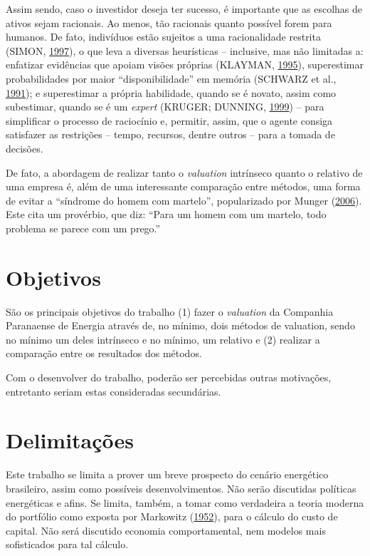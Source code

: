\documentclass[grad,numbers]{coppe}
\begin{document}
  Assim sendo, caso o investidor deseja ter sucesso, é importante que as escolhas de ativos sejam racionais. Ao menos, tão racionais quanto possível forem para humanos. De fato, indivíduos estão sujeitos a uma racionalidade restrita (SIMON, \protect\hyperlink{ref-simon1997}{1997}), o que leva a diversas heurísticas -- inclusive, mas não limitadas a: enfatizar evidências que apoiam visões próprias (KLAYMAN, \protect\hyperlink{ref-klayman1995}{1995}), superestimar probabilidades por maior ``disponibilidade'' em memória (SCHWARZ et al., \protect\hyperlink{ref-schwarz1991}{1991}); e superestimar a própria habilidade, quando se é novato, assim como subestimar, quando se é um \emph{expert} (KRUGER; DUNNING, \protect\hyperlink{ref-kruger1999}{1999}) -- para simplificar o processo de raciocínio e, permitir, assim, que o agente consiga satisfazer as restrições -- tempo, recursos, dentre outros -- para a tomada de decisões.

  De fato, a abordagem de realizar tanto o \emph{valuation} intrínseco quanto o relativo de uma empresa é, além de uma interessante comparação entre métodos, uma forma de evitar a ``síndrome do homem com martelo'', popularizado por Munger (\protect\hyperlink{ref-munger2006}{2006}). Este cita um provérbio, que diz: ``Para um homem com um martelo, todo problema se parece com um prego.''

  \hypertarget{objetivos}{%
  \section{Objetivos}\label{objetivos}}

  São os principais objetivos do trabalho (1) fazer o \emph{valuation} da Companhia Paranaense de Energia através de, no mínimo, dois métodos de valuation, sendo no mínimo um deles intrínseco e no mínimo, um relativo e (2) realizar a comparação entre os resultados dos métodos.

  Com o desenvolver do trabalho, poderão ser percebidas outras motivações, entretanto seriam estas consideradas secundárias.

  \hypertarget{delimitauxe7uxf5es}{%
  \section{Delimitações}\label{delimitauxe7uxf5es}}

  Este trabalho se limita a prover um breve prospecto do cenário energético brasileiro, assim como possíveis desenvolvimentos. Não serão discutidas políticas energéticas e afins. Se limita, também, a tomar como verdadeira a teoria moderna do portfólio como exposta por Markowitz (\protect\hyperlink{ref-markowitz1952}{1952}), para o cálculo do custo de capital. Não será discutido economia comportamental, nem modelos mais sofisticados para tal cálculo.
\end{document}
